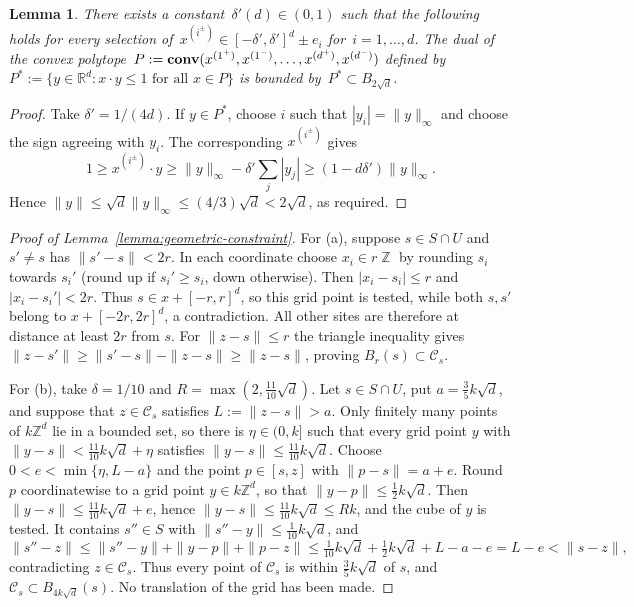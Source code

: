 \documentclass[12pt]{amsart}
\numberwithin{equation}{section}
\DeclareMathOperator{\Z}{\mathbb{Z}}
\DeclareMathOperator{\conv}{\mathop{\bf conv}}
\newtheorem{lemma}[theorem]{Lemma}
\newcommand*{\Zd}{\ensuremath{\mathbb{Z}^d}}
\newcommand*{\Rd}{\ensuremath{\mathbb{R}^d}}
\begin{document}
\begin{lemma} \label{lemma:dual-polytope-bound}
	There exists a constant~$\delta'(d) \in (0,1)$ such that the following holds for every selection of~$x^{(i^{\pm})} \in [-\delta', \delta']^d \pm e_i$ for~$i = 1, \ldots, d$.
	The dual of the convex polytope~$P := \conv(x^{(1^+)}, x^{(1^-)}, \ldots, x^{(d^+)}, x^{(d^-)})$ defined by~$P^* := \{ y \in \Rd: x \cdot y \leq 1 \mbox{ for all~$x \in P$}\}$ is bounded by~$P^* \subset B_{2 \sqrt{d}}$. 
\end{lemma}
\begin{proof}
Take $\delta'=1/(4d)$. If $y\in P^*$, choose $i$ such that $|y_i|=\|y\|_\infty$ and choose the sign agreeing with $y_i$. The corresponding $x^{(i^\pm)}$ gives
\[
 1\geq x^{(i^\pm)}\cdot y
 \geq\|y\|_\infty-\delta'\sum_j|y_j|
 \geq(1-d\delta')\|y\|_\infty.
\]
Hence $\|y\|\leq\sqrt d\|y\|_\infty\leq(4/3)\sqrt d<2\sqrt d$, as required.
\end{proof}


\begin{proof}[Proof of Lemma~\ref{lemma:geometric-constraint}]
For (a), suppose $s\in S\cap U$ and $s'\neq s$ has $\|s'-s\|<2r$. In each coordinate choose $x_i\in r\Z$ by rounding $s_i$ towards $s_i'$ (round up if $s_i'\geq s_i$, down otherwise). Then $|x_i-s_i|\leq r$ and $|x_i-s_i'|<2r$. Thus $s\in x+[-r,r]^d$, so this grid point is tested, while both $s,s'$ belong to $x+[-2r,2r]^d$, a contradiction. All other sites are therefore at distance at least $2r$ from $s$. For $\|z-s\|\leq r$ the triangle inequality gives $\|z-s'\|\geq\|s'-s\|-\|z-s\|\geq\|z-s\|$, proving $B_r(s)\subset\mathcal C_s$.

For (b), take $\delta=1/10$ and $R=\max(2,\tfrac{11}{10}\sqrt d)$. Let $s\in S\cap U$, put $a=\tfrac35k\sqrt d$, and suppose that $z\in\mathcal C_s$ satisfies $L:=\|z-s\|>a$. Only finitely many points of $k\Zd$ lie in a bounded set, so there is $\eta\in(0,k]$ such that every grid point $y$ with $\|y-s\|<\tfrac{11}{10}k\sqrt d+\eta$ satisfies $\|y-s\|\leq\tfrac{11}{10}k\sqrt d$. Choose $0<e<\min\{\eta,L-a\}$ and the point $p\in[s,z]$ with $\|p-s\|=a+e$. Round $p$ coordinatewise to a grid point $y\in k\Zd$, so that $\|y-p\|\leq\tfrac12k\sqrt d$. Then $\|y-s\|\leq\tfrac{11}{10}k\sqrt d+e$, hence $\|y-s\|\leq\tfrac{11}{10}k\sqrt d\leq Rk$, and the cube of $y$ is tested. It contains $s''\in S$ with $\|s''-y\|\leq\tfrac1{10}k\sqrt d$, and
\[
 \|s''-z\|\leq\|s''-y\|+\|y-p\|+\|p-z\|
 \leq\tfrac1{10}k\sqrt d+\tfrac12k\sqrt d+L-a-e=L-e<\|s-z\|,
\]
contradicting $z\in\mathcal C_s$. Thus every point of $\mathcal C_s$ is within $\tfrac35k\sqrt d$ of $s$, and $\mathcal C_s\subset B_{4k\sqrt d}(s)$. No translation of the grid has been made.
\end{proof}
\end{document}
